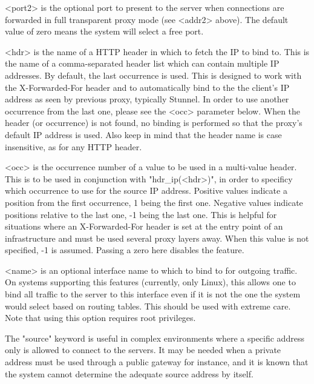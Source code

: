     <port2>   is the optional port to present to the server when connections
              are forwarded in full transparent proxy mode (see <addr2> above).
              The default value of zero means the system will select a free
              port.

    <hdr>     is the name of a HTTP header in which to fetch the IP to bind to.
              This is the name of a comma-separated header list which can
              contain multiple IP addresses. By default, the last occurrence is
              used. This is designed to work with the X-Forwarded-For header
              and to automatically bind to the the client's IP address as seen
              by previous proxy, typically Stunnel. In order to use another
              occurrence from the last one, please see the <occ> parameter
              below. When the header (or occurrence) is not found, no binding
              is performed so that the proxy's default IP address is used. Also
              keep in mind that the header name is case insensitive, as for any
              HTTP header.

    <occ>     is the occurrence number of a value to be used in a multi-value
              header. This is to be used in conjunction with "hdr_ip(<hdr>)",
              in order to specificy which occurrence to use for the source IP
              address. Positive values indicate a position from the first
              occurrence, 1 being the first one. Negative values indicate
              positions relative to the last one, -1 being the last one. This
              is helpful for situations where an X-Forwarded-For header is set
              at the entry point of an infrastructure and must be used several
              proxy layers away. When this value is not specified, -1 is
              assumed. Passing a zero here disables the feature.

    <name>    is an optional interface name to which to bind to for outgoing
              traffic. On systems supporting this features (currently, only
              Linux), this allows one to bind all traffic to the server to
              this interface even if it is not the one the system would select
              based on routing tables. This should be used with extreme care.
              Note that using this option requires root privileges.

  The "source" keyword is useful in complex environments where a specific
  address only is allowed to connect to the servers. It may be needed when a
  private address must be used through a public gateway for instance, and it is
  known that the system cannot determine the adequate source address by itself.

